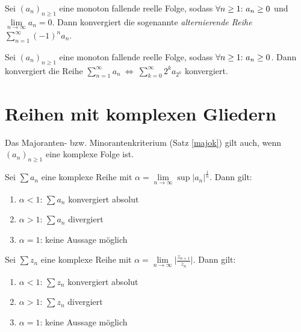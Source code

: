 \begin{framedthm}
	Sei $(a_n)_{n\geq 1}$ eine monoton fallende reelle Folge, sodass $\forall n \geq 1{:}\  a_n \geq 0$ und\\ $\lim\limits_{n \to \infty} a_n = 0$. Dann konvergiert die sogenannte \textit{alternierende Reihe} $\sum_{n=1}^{\infty} (-1)^n a_n$.
\end{framedthm}

\begin{framedthm}
	Sei $(a_n)_{n\geq 1}$ eine monoton fallende reelle Folge, sodass $\forall n \geq 1{:}\  a_n \geq 0$. Dann konvergiert die Reihe $\sum_{n=1}^{\infty} a_n \ \iff \ \sum_{k=0}^{\infty} 2^k a_{2^k}$ konvergiert.
\end{framedthm}

\section{Reihen mit komplexen Gliedern}

\begin{framedthm}
	Das Majoranten- bzw. Minorantenkriterium (Satz \ref{majok}) gilt auch, wenn $(a_n)_{n\geq 1}$ eine komplexe Folge ist.
\end{framedthm}

\begin{framedthm}
	Sei $\sum a_n$ eine komplexe Reihe mit $\alpha = \lim\limits_{n \to \infty} \sup |a_n|^{\frac{1}{n}}$. Dann gilt:
	\begin{enumerate}
		\item $\alpha < 1$: $\sum a_n$ konvergiert absolut
		\item $\alpha > 1$: $\sum a_n$ divergiert
		\item $\alpha = 1$: keine Aussage möglich
	\end{enumerate}
\end{framedthm}

\begin{framedthm}
	Sei $\sum z_n$ eine komplexe Reihe mit $\alpha = \lim\limits_{n \to \infty} \bigl| \frac{z_{n+1}}{z_n}\bigr|$. Dann gilt:
	\begin{enumerate}
		\item $\alpha < 1$: $\sum z_n$ konvergiert absolut
		\item $\alpha > 1$: $\sum z_n$ divergiert
		\item $\alpha = 1$: keine Aussage möglich
	\end{enumerate}
\end{framedthm}

